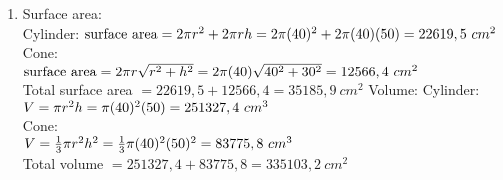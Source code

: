 \begin{eocsolutions}{}
{\begin{enumerate}[itemsep=5pt, label=\textbf{\arabic*}. ]
\begin{enumerate}[itemsep=5pt, label=\textbf{\alph*}. ]
Square pyramid:\\
$V = \frac{1}{3} A \times h \\
= \frac{1}{3} (15)^2 \times 12 \\
= 900 ~cm^{3}$\\

Half sphere:\\
$V = \dfrac{(\frac{4}{3}\pi r^{3})}{2}\\
= \dfrac{(\frac{4}{3} \pi (4)^3)}{2}\\
= 134 ~cm^{3}$
      \end{enumerate}
\item Surface area:\\
Cylinder:
$\text{surface area} = 2 \pi r^2 + 2\pi rh\\
= 2 \pi(40)^2 + 2\pi(40)(50)\\
= 22619,5 ~cm^{2}$\\
Cone:\\
$\text{surface area} = 2 \pi r \sqrt{r^2 + h^2}\\
= 2 \pi (40) \sqrt{40^2 + 30^2} \\
= 12566,4 ~cm^{2}$\\
Total surface area $= 22619,5 + 12566,4 = 35185,9 ~cm^{2}$
Volume:
Cylinder:
$V =  \pi r^2 h\\
=  \pi(40)^2 (50)\\
= 251327,4 ~cm^{3}$\\
Cone:\\
$V = \frac{1}{3} \pi r^2 h^2\\
= \frac{1}{3} \pi (40)^2  (50)^2 \\
= 83775,8 ~cm^{3}$\\
Total volume $= 251327,4 + 83775,8 = 335103,2 ~cm^{2}$\\
\end{enumerate}}
\end{eocsolutions}


